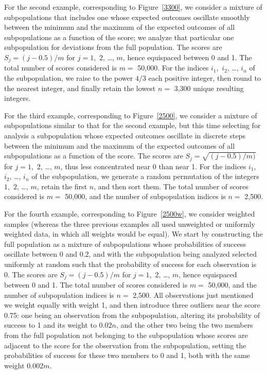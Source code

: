 \documentclass{article}
\begin{document}
For the second example, corresponding to Figure~\ref{3300}, we consider
a mixture of subpopulations that includes one whose expected outcomes
oscillate smoothly between the minimum and the maximum of the expected outcomes
of all subpopulations as a function of the score; we analyze that particular
one subpopulation for deviations from the full population.
The scores are $S_j = (j - 0.5) / m$ for $j = 1$,~$2$, \dots, $m$,
hence equispaced between 0 and 1.
The total number of scores considered is $m =$ 50,000.
For the indices $i_1$,~$i_2$, \dots, $i_n$ of the subpopulation,
we raise to the power $4/3$ each positive integer,
then round to the nearest integer,
and finally retain the lowest $n =$ 3,300 unique resulting integers.

For the third example, corresponding to Figure~\ref{2500},
we consider a mixture of subpopulations similar to that for the second example,
but this time selecting for analysis a subpopulation
whose expected outcomes oscillate in discrete steps between the minimum
and the maximum of the expected outcomes of all subpopulations as a function
of the score.
The scores are $S_j = \sqrt{(j - 0.5) / m)}$ for $j = 1$,~$2$, \dots, $m$,
thus less concentrated near 0 than near 1.
For the indices $i_1$,~$i_2$, \dots, $i_n$ of the subpopulation,
we generate a random permutation of the integers $1$,~$2$, \dots, $m$,
retain the first $n$, and then sort them.
The total number of scores considered is $m =$ 50,000,
and the number of subpopulation indices is $n =$ 2,500.

For the fourth example, corresponding to Figure~\ref{2500w},
we consider weighted samples (whereas the three previous examples
all used unweighted or uniformly weighted data,
in which all weights would be equal).
We start by constructing the full population as a mixture of subpopulations
whose probabilities of success oscillate between 0 and 0.2,
and with the subpopulation being analyzed selected uniformly at random
such that the probability of success for each observation is 0.
The scores are $S_j = (j - 0.5) / m$ for $j = 1$,~$2$, \dots, $m$,
hence equispaced between 0 and 1.
The total number of scores considered is $m =$ 50,000,
and the number of subpopulation indices is $n =$ 2,500.
All observations just mentioned we weight equally with weight 1,
and then introduce three outliers near the score 0.75:
one being an observation from the subpopulation,
altering its probability of success to 1 and its weight to $0.02 n$,
and the other two being the two members from the full population
not belonging to the subpopulation whose scores are adjacent to the score
for the observation from the subpopulation, setting the probabilities
of success for these two members to 0 and 1,
both with the same weight $0.002 m$.
\end{document}
